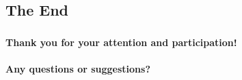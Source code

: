 \documentclass[notes,handout]{beamer}
\newcommand{\BLUE}[1]{\textcolor[rgb]{0.192,0.204,0.709}{#1}}
\begin{document}
\subsection<presentation>[The End]{The End}
\begin{frame}
  \frametitle<presentation>[Thank you!]{}
  \begin{center} 
      \textbf{\Large Thank you for your attention and participation!}
\\$ $\\
      \textbf{\normalsize \BLUE{Any questions or suggestions?}} \\
      
  \end{center}
\end{frame}

\end{document}
